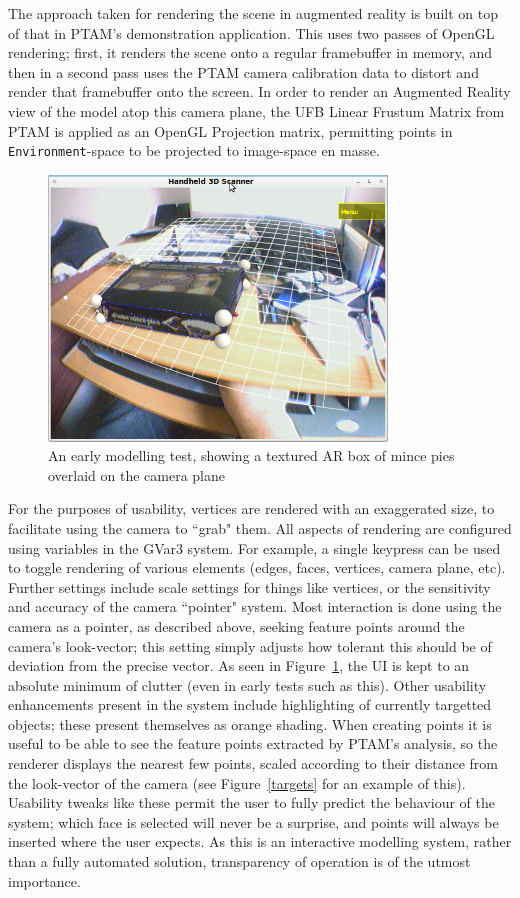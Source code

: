 \documentclass[a4paper,10pt]{article}
\begin{document}
The approach taken for rendering the scene in augmented reality is built on top of that in PTAM's demonstration application. This uses two passes of OpenGL rendering; first, it renders the scene onto a regular framebuffer in memory, and then in a second pass uses the PTAM camera calibration data to distort and render that framebuffer onto the screen. In order to render an Augmented Reality view of the model atop this camera plane, the UFB Linear Frustum Matrix from PTAM is applied as an OpenGL Projection matrix, permitting points in \texttt{Environment}-space to be projected to image-space en masse.

\begin{figure}
  \begin{center}
    \includegraphics[width=340px]{MincePies}
  \end{center}
  \caption{An early modelling test, showing a textured AR box of mince pies overlaid on the camera plane}
  \label{pies}
\end{figure}

For the purposes of usability, vertices are rendered with an exaggerated size, to facilitate using the camera to ``grab" them. All aspects of rendering are configured using variables in the GVar3 system. For example, a single keypress can be used to toggle rendering of various elements (edges, faces, vertices, camera plane, etc). Further settings include scale settings for things like vertices, or the sensitivity and accuracy of the camera ``pointer" system. Most interaction is done using the camera as a pointer, as described above, seeking feature points around the camera's look-vector; this setting simply adjusts how tolerant this should be of deviation from the precise vector. As seen in Figure~\ref{pies}, the UI is kept to an absolute minimum of clutter (even in early tests such as this). Other usability enhancements present in the system include highlighting of currently targetted objects; these present themselves as orange shading. When creating points it is useful to be able to see the feature points extracted by PTAM's analysis, so the renderer displays the nearest few points, scaled according to their distance from the look-vector of the camera (see Figure~\ref{targets} for an example of this). Usability tweaks like these permit the user to fully predict the behaviour of the system; which face is selected will never be a surprise, and points will always be inserted where the user expects. As this is an interactive modelling system, rather than a fully automated solution, transparency of operation is of the utmost importance.
\end{document}

